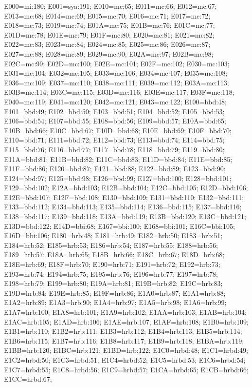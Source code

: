 \raggedright\small E000=mi:180; E001=sya:191; E010=mc:65; E011=mc:66;
E012=mc:67; E013=mc:68; E014=mc:69; E015=mc:70; E016=mc:71; E017=mc:72;
E018=mc:73; E019=mc:74; E01A=mc:75; E01B=mc:76; E01C=mc:77; E01D=mc:78;
E01E=mc:79; E01F=mc:80; E020=mc:81; E021=mc:82; E022=mc:83; E023=mc:84;
E024=mc:85; E025=mc:86; E026=mc:87; E027=mc:88; E028=mc:89; E029=mc:90;
E02A=mc:97; E02B=mc:98; E02C=mc:99; E02D=mc:100; E02E=mc:101; E02F=mc:102;
E030=mc:103; E031=mc:104; E032=mc:105; E033=mc:106; E034=mc:107; E035=mc:108;
E036=mc:109; E037=mc:110; E038=mc:111; E039=mc:112; E03A=mc:113; E03B=mc:114;
E03C=mc:115; E03D=mc:116; E03E=mc:117; E03F=mc:118; E040=mc:119; E041=mc:120;
E042=mc:121; E043=mc:122; E100=bbd:48; E101=bbd:49; E102=bbd:50; E103=bbd:51;
E104=bbd:52; E105=bbd:53; E106=bbd:54; E107=bbd:55; E108=bbd:56; E109=bbd:57;
E10A=bbd:65; E10B=bbd:66; E10C=bbd:67; E10D=bbd:68; E10E=bbd:69; E10F=bbd:70;
E110=bbd:71; E111=bbd:72; E112=bbd:73; E113=bbd:74; E114=bbd:75; E115=bbd:76;
E116=bbd:77; E117=bbd:78; E118=bbd:79; E119=bbd:80; E11A=bbd:81; E11B=bbd:82;
E11C=bbd:83; E11D=bbd:84; E11E=bbd:85; E11F=bbd:86; E120=bbd:87; E121=bbd:88;
E122=bbd:89; E123=bbd:90; E124=bbd:97; E125=bbd:98; E126=bbd:99; E127=bbd:100;
E128=bbd:101; E129=bbd:102; E12A=bbd:103; E12B=bbd:104; E12C=bbd:105;
E12D=bbd:106; E12E=bbd:107; E12F=bbd:108; E130=bbd:109; E131=bbd:110;
E132=bbd:111; E133=bbd:112; E134=bbd:113; E135=bbd:114; E136=bbd:115;
E137=bbd:116; E138=bbd:117; E139=bbd:118; E13A=bbd:119; E13B=bbd:120;
E13C=bbd:121; E13D=bbd:122; E14D=bbi:68; E167=bbi:100; E168=bbi:101;
E16C=bbi:105; E16D=bbi:106; E180=hrb:48; E181=hrb:49; E182=hrb:50; E183=hrb:51;
E184=hrb:52; E185=hrb:53; E186=hrb:54; E187=hrb:55; E188=hrb:56; E189=hrb:57;
E18A=hrb:65; E18B=hrb:66; E18C=hrb:67; E18D=hrb:68; E18E=hrb:69; E18F=hrb:70;
E190=hrb:71; E191=hrb:72; E192=hrb:73; E193=hrb:74; E194=hrb:75; E195=hrb:76;
E196=hrb:77; E197=hrb:78; E198=hrb:79; E199=hrb:80; E19A=hrb:81; E19B=hrb:82;
E19C=hrb:83; E19D=hrb:84; E19E=hrb:85; E19F=hrb:86; E1A0=hrb:87; E1A1=hrb:88;
E1A2=hrb:89; E1A3=hrb:90; E1A4=hrb:97; E1A5=hrb:98; E1A6=hrb:99; E1A7=hrb:100;
E1A8=hrb:101; E1A9=hrb:102; E1AA=hrb:103; E1AB=hrb:104; E1AC=hrb:105;
E1AD=hrb:106; E1AE=hrb:107; E1AF=hrb:108; E1B0=hrb:109; E1B1=hrb:110;
E1B2=hrb:111; E1B3=hrb:112; E1B4=hrb:113; E1B5=hrb:114; E1B6=hrb:115;
E1B7=hrb:116; E1B8=hrb:117; E1B9=hrb:118; E1BA=hrb:119; E1BB=hrb:120;
E1BC=hrb:121; E1BD=hrb:122; E1C0=hrbd:48; E1C1=hrbd:49; E1C2=hrbd:50;
E1C3=hrbd:51; E1C4=hrbd:52; E1C5=hrbd:53; E1C6=hrbd:54; E1C7=hrbd:55;
E1C8=hrbd:56; E1C9=hrbd:57; E1CA=hrbd:65; E1CB=hrbd:66; E1CC=hrbd:67;
